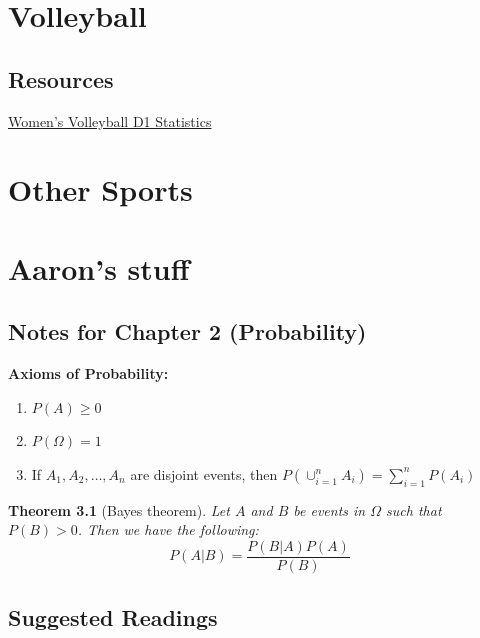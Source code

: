 \documentclass[
  11pt,
]{book}
\newtheorem{theorem}{Theorem}[chapter]
\theoremstyle{definition}
\theoremstyle{definition}
\theoremstyle{definition}
\theoremstyle{definition}
\theoremstyle{remark}
\begin{document}
\hypertarget{volleyball-1}{%
\chapter{Volleyball}\label{volleyball-1}}

\hypertarget{resources}{%
\section{Resources}\label{resources}}

\href{https://www.ncaa.com/stats/volleyball-women/d1}{Women's Volleyball D1 Statistics}

\hypertarget{other-sports}{%
\chapter{Other Sports}\label{other-sports}}

\hypertarget{aarons-stuff}{%
\chapter{Aaron's stuff}\label{aarons-stuff}}

\hypertarget{notes-for-chapter-2-probability}{%
\section{Notes for Chapter 2 (Probability)}\label{notes-for-chapter-2-probability}}

\textbf{Axioms of Probability:}

\begin{enumerate}
\def\labelenumi{\arabic{enumi}.}
\item
  \(P(A) \geq 0\)
\item
  \(P(\Omega)=1\)
\item
  If \(A_1, A_2, \ldots, A_n\) are disjoint events, then \(P(\cup_{i=1}^n A_i) = \sum_{i=1}^n P(A_i)\)
\end{enumerate}

\begin{theorem}[Bayes theorem]
Let \(A\) and \(B\) be events in \(\Omega\) such that \(P(B)>0\). Then we have the following:
\[
P(A|B) = \frac{P(B|A)P(A)}{P(B)}
\]
\end{theorem}

\hypertarget{suggested-readings}{%
\section{Suggested Readings}\label{suggested-readings}}
\end{document}

